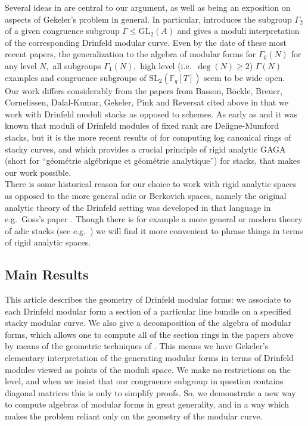\documentclass[11pt]{amsart}
\theoremstyle{definition}
\numberwithin{equation}{section}
\newcommand{\GL}{\mathrm{GL}} 	%
\newcommand{\SL}{\mathrm{SL}} 	%
\newcommand{\bbF}{\mathbb{F}}		%
\begin{document}
		Several ideas in \cite{Breuer-Gekeler-h-function} are central to our argument, as well as being an exposition on aspects of Gekeler's problem in general. In particular, \cite{Breuer-Gekeler-h-function} introduces the subgroup $\Gamma_2$ of a given congruence subgroup $\Gamma\leq\GL_2(A)$ and gives a moduli interpretation of the corresponding Drinfeld modular curve. Even by the date of these most recent papers, the generalization to the algebra of modular forms for $\Gamma_0(N)$ for any level $N,$ all subgroups $\Gamma_1(N),$ high level (i.e.\ $\deg(N)\geq 2$) $\Gamma(N)$ examples and congruence subgroups of $\SL_2(\bbF_q[T])$ seem to be wide open.\\
		
		Our work differs considerably from the papers from Basson, B\"ockle, Breuer, Cornelissen, Dalal-Kumar, Gekeler, Pink and Reversat cited above in that we work with Drinfeld moduli stacks as opposed to schemes. As early as \cite{Gekeler-Curves} and \cite{Laumon-cohomology-Drinfeld-modular-varieties} it was known that moduli of Drinfeld modules of fixed rank are Deligne-Mumford stacks, but it is the more recent results of \cite{VZB} for computing log canonical rings of stacky curves, and \cite{Porta-Yu-Higher-analytic-stacks-GAGA} which provides a crucial principle of rigid analytic GAGA (short for ``g\'eom\'etrie alg\'ebrique et g\'eom\'etrie analytique'') for stacks, that makes our work possible.\\
		
		There is some historical reason for our choice to work with rigid analytic spaces as opposed to the more general adic or Berkovich spaces, namely the original analytic theory of the Drinfeld setting was developed in that language in e.g.\ Goss's paper \cite{Goss-upper-halfplane}. Though there is for example a more general or modern theory of adic stacks (see e.g.\ \cite{Warner-thesis-adic-moduli-spaces}) we will find it more convenient to phrase things in terms of rigid analytic spaces.
		
		\subsection{Main Results}
		
		This article describes the geometry of Drinfeld modular forms: we associate to each Drinfeld modular form a section of a particular line bundle on a specified stacky modular curve.
		We also give a decomposition of the algebra of modular forms, which allows one to compute all of the section rings in the papers above by means of the geometric techniques of \cite{VZB}. This means we have Gekeler's elementary interpretation of the generating modular forms in terms of Drinfeld modules viewed as points of the moduli space. We make no restrictions on the level, and when we insist that our congruence subgroup in question contains diagonal matrices this is only to simplify proofs. So, we demonstrate a new way to compute algebras of modular forms in great generality, and in a way which makes the problem reliant only on the geometry of the modular curve.\\  
		
\end{document}
